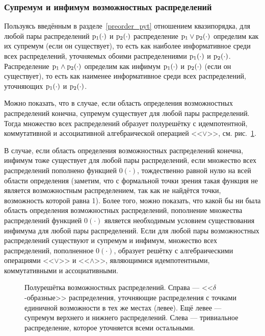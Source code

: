 \subsubsection{Супремум и инфимум возможностных распределений}
\label{inf_sup_poss}
Пользуясь введённым в разделе~\ref{preorder_pyt} отношением квазипорядка, для любой пары распределений ${\mathrm{p}}_1(\cdot)$ и ${\mathrm{p}}_2(\cdot)$ распределение ${\mathrm{p}}_1\vee{\mathrm{p}}_2(\cdot)$ определим как их супремум (если он существует), то есть как наиболее информативное среди всех распределений, уточняемых обоими распределениями ${\mathrm{p}}_1(\cdot)$ и ${\mathrm{p}}_2(\cdot)$. Распределение ${\mathrm{p}}_1\wedge{\mathrm{p}}_2(\cdot)$ определим как инфимум ${\mathrm{p}}_1(\cdot)$ и ${\mathrm{p}}_2(\cdot)$ (если он существует), то есть как наименее информативное среди всех распределений, уточняющих ${\mathrm{p}}_1(\cdot)$ и ${\mathrm{p}}_2(\cdot)$.

Можно показать, что в случае, если область определения возможностных распределений конечна, супремум существует для любой пары распределений.  Тогда множество всех распределений образует полурешётку с идемпотентной, коммутативной и ассоциативной алгебраической операцией <<$\vee$>>, см. рис.~\ref{ris:half_lattice}. 
\begin{notice}
В случае, если область определения возможностных распределений конечна, инфимум тоже существует для любой пары распределений, если множество всех распределений пополнено функцией $0(\cdot)$, тождественно равной нулю на всей области определения (заметим, что с формальной точки зрения такая функция не является возможностным распределением, так как не найдётся точки, возможность которой равна 1). Более того, можно показать, что какой бы ни была область определения возможностных распределений, пополнение множества распределений функцией $0(\cdot)$ является необходимым условием существования инфимума для любой пары распределений. Если для любой пары возможностных распределений существуют и супремум и инфимум, множество всех распределений, пополненное $0(\cdot)$, образует решётку с алгебраическими операциями <<$\vee$>> и <<$\wedge$>>, являющимися идемпотентными, коммутативными и ассоциативными.
\end{notice}

\begin{figure}[h]
\caption{\small Полурешётка возможностных распределений. Справа --- <<$\delta$-образные>> распределения, уточняющие распределения с точками единичной возможности в тех же местах (левее). Ещё левее --- супремум верхнего и нижнего распределений. Слева --- тривиальное распределение, которое уточняется всеми остальными. }
\label{ris:half_lattice}
\end{figure}

